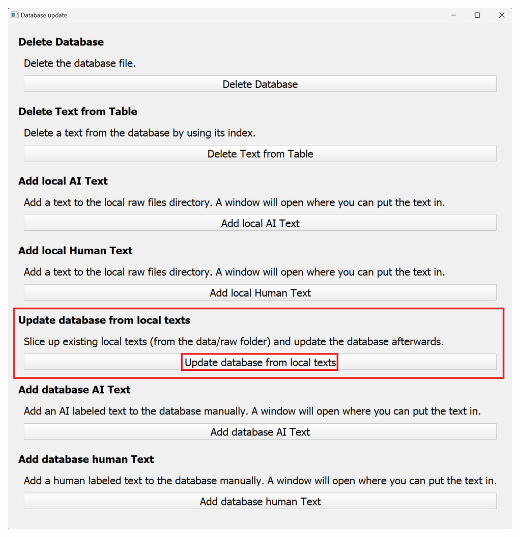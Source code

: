 \begin{enumerate}
\begin{center}
        \includegraphics[width=16.5cm]{Images/Usage/Demo/Update-database.png}
    \end{center}
\end{enumerate}
\clearpage
